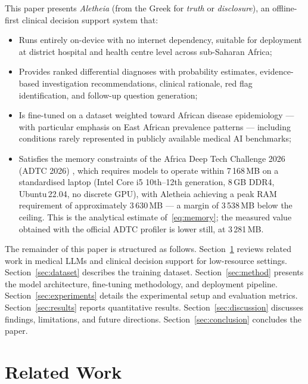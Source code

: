 \documentclass[journal]{IEEEtran}
\begin{document}
This paper presents \textit{Aletheia} (from the Greek for
\textit{truth} or \textit{disclosure}), an offline-first clinical
decision support system that:
\begin{itemize}
  \item Runs entirely on-device with no internet dependency,
        suitable for deployment at district hospital and health
        centre level across sub-Saharan Africa;
  \item Provides ranked differential diagnoses with probability
        estimates, evidence-based investigation recommendations,
        clinical rationale, red flag identification, and follow-up
        question generation;
  \item Is fine-tuned on a dataset weighted toward African disease
        epidemiology --- with particular emphasis on East African
        prevalence patterns --- including conditions rarely represented
        in publicly available medical AI benchmarks;
  \item Satisfies the memory constraints of the Africa Deep Tech
        Challenge 2026 (ADTC 2026) \cite{adtc2026}, which requires
        models to operate within 7\,168\,MB on a standardised laptop
        (Intel Core i5 10th--12th generation, 8\,GB DDR4,
        Ubuntu\,22.04, no discrete GPU), with Aletheia achieving a
        peak RAM requirement of approximately 3\,630\,MB --- a margin
        of 3\,538\,MB below the ceiling. This is the analytical
        estimate of~\eqref{eq:memory}; the measured value obtained
        with the official ADTC profiler is lower still, at
        3\,281\,MB.
\end{itemize}

The remainder of this paper is structured as follows.
Section~\ref{sec:related} reviews related work in medical LLMs
and clinical decision support for low-resource settings.
Section~\ref{sec:dataset} describes the training dataset.
Section~\ref{sec:method} presents the model architecture, fine-tuning
methodology, and deployment pipeline.
Section~\ref{sec:experiments} details the experimental setup and
evaluation metrics.
Section~\ref{sec:results} reports quantitative results.
Section~\ref{sec:discussion} discusses findings, limitations, and
future directions.
Section~\ref{sec:conclusion} concludes the paper.

\section{Related Work}
\label{sec:related}
\end{document}
